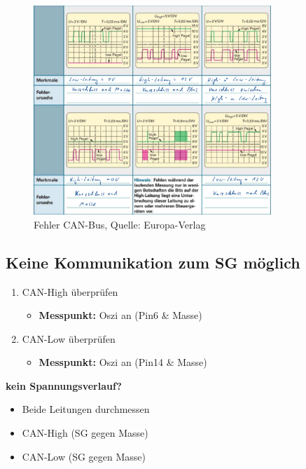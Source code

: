 \begin{figure}[!ht]%
\centering
\includegraphics[width=0.8\textwidth]{images/CAN-Bus/CAN-Bus-5.pdf}
\caption{Fehler CAN-Bus, Quelle: Europa-Verlag}
\end{figure}

\newpage

\subsection{Keine Kommunikation zum SG
möglich}\label{keine-kommunikation-zum-sg-moeglich}

\begin{enumerate}
\item
  CAN-High überprüfen

  \begin{itemize}
  \item
    \textbf{Messpunkt:} Oszi an (Pin6 \& Masse)
  \end{itemize}
\item
  CAN-Low überprüfen

  \begin{itemize}
  \item
    \textbf{Messpunkt:} Oszi an (Pin14 \& Masse)
  \end{itemize}
\end{enumerate}

\textbf{kein Spannungsverlauf?}

\begin{itemize}
\item
  Beide Leitungen durchmessen
\item
  CAN-High (SG gegen Masse)
\item
  CAN-Low (SG gegen Masse)
\end{itemize}
